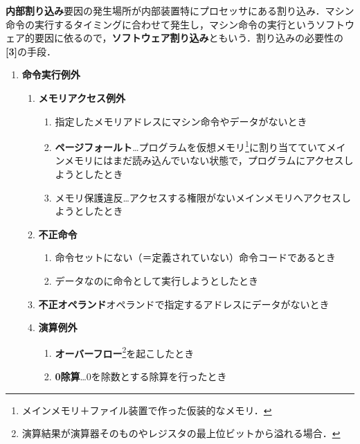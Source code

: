 \begin{enumerate}[label=\textbf{[\Alph*]}, labelsep=10pt, leftmargin=23pt]
	\item \textbf{内部割り込み}\quad 要因の発生場所が内部装置特にプロセッサにある割り込み．マシン命令の実行するタイミングに合わせて発生し，マシン命令の実行というソフトウェア的要因に依るので，\textbf{ソフトウェア割り込み}ともいう．割り込みの必要性の\textbf{[3]}の手段．
		\begin{enumerate}[label=\textbf{(\arabic*)}, labelsep=10pt, leftmargin=23pt]
			\item \textbf{命令実行例外}
				\begin{enumerate}[label={\color{gray}●}, labelsep=10pt, leftmargin=23pt]
					\item \textbf{メモリアクセス例外}
						\begin{enumerate}[label=\textbf{(\roman*)}, labelsep=10pt, leftmargin=23pt]
							\item 指定したメモリアドレスにマシン命令やデータがないとき
							\item \textbf{ページフォールト}…プログラムを仮想メモリ\footnote{メインメモリ＋ファイル装置で作った仮装的なメモリ．}に割り当てていてメインメモリにはまだ読み込んでいない状態で，プログラムにアクセスしようとしたとき
							\item メモリ保護違反…アクセスする権限がないメインメモリへアクセスしようとしたとき
						\end{enumerate}
					\item \textbf{不正命令}
						\begin{enumerate}[label=\textbf{(\roman*)}, labelsep=10pt, leftmargin=23pt]
							\item 命令セットにない（＝定義されていない）命令コードであるとき
							\item データなのに命令として実行しようとしたとき
						\end{enumerate}
					\item \textbf{不正オペランド}\quad オペランドで指定するアドレスにデータがないとき
					\item \textbf{演算例外}
						\begin{enumerate}[label=\textbf{(\roman*)}, labelsep=10pt, leftmargin=23pt]
							\item \textbf{オーバーフロー}\footnote{演算結果が演算器そのものやレジスタの最上位ビットから溢れる場合．}を起こしたとき
							\item \textbf{0除算}…0を除数とする除算を行ったとき
						\end{enumerate}
				\end{enumerate}

\end{enumerate}
\end{enumerate}
